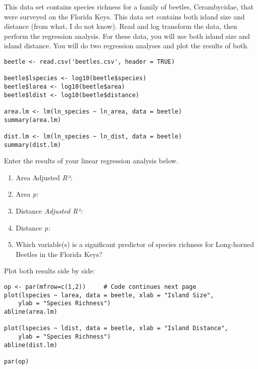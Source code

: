 \documentclass[11pt]{article}
\begin{document}
This data set contains species richness for a family of beetles, Cerambycidae, that were surveyed on the Florida Keys. This data set contains both island size and distance (from what, I do not know).  Read and log transform the data, then perform the regression analysis.  For these data, you will use both island size and island distance.  You will do two regression analyses and plot the results of both.

\begin{verbatim}
beetle <- read.csv('beetles.csv', header = TRUE)

beetle$lspecies <- log10(beetle$species)
beetle$larea <- log10(beetle$area)
beetle$ldist <- log10(beetle$distance)

area.lm <- lm(ln_species ~ ln_area, data = beetle)
summary(area.lm)

dist.lm <- lm(ln_species ~ ln_dist, data = beetle)
summary(dist.lm)

\end{verbatim}

Enter the results of your linear regression analysis below.

\begin{enumerate}
	\item  Area Adjusted \textit{R²:} 
	
	\item Area \textit{p:}

	\item  Distance \textit{Adjusted R²:} 
	
	\item Distance \textit{p:}
	
	\item Which variable(s) is a significant predictor of species richness for Long-horned Beetles in the Florida Keys?
\end{enumerate}

\vspace{4\baselineskip}

Plot both results side by side:

\begin{verbatim}
op <- par(mfrow=c(1,2))     # Code continues next page
plot(lspecies ~ larea, data = beetle, xlab = "Island Size",
    ylab = "Species Richness")
abline(area.lm)

plot(lspecies ~ ldist, data = beetle, xlab = "Island Distance",
    ylab = "Species Richness")
abline(dist.lm)

par(op)
\end{verbatim}
\end{document}
